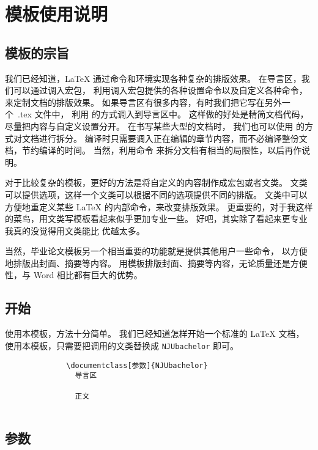 \chapter{模板使用说明}

\section{模板的宗旨}

我们已经知道，\LaTeX{} 通过命令和环境实现各种复杂的排版效果。
在导言区，我们可以通过调入宏包，
利用调入宏包提供的各种设置命令以及自定义各种命令，
来定制文档的排版效果。
如果导言区有很多内容，有时我们把它写在另外一个~.tex 文件中，
利用 \verb|| 的方式调入到导言区中。
这样做的好处是精简文档代码，尽量把内容与自定义设置分开。
在书写某些大型的文档时，
我们也可以使用 \verb|| 的方式对文档进行拆分。
编译时只需要调入正在编辑的章节内容，而不必编译整份文档，节约编译的时间。
当然，利用命令 \verb|| 来拆分文档有相当的局限性，以后再作说明。

对于比较复杂的模板，更好的方法是将自定义的内容制作成宏包或者文类。
文类可以提供选项，这样一个文类可以根据不同的选项提供不同的排版。
文类中可以方便地重定义某些 \LaTeX{} 的内部命令，来改变排版效果。
更重要的，对于我这样的菜鸟，用文类写模板看起来似乎更加专业一些。
好吧，其实除了看起来更专业我真的没觉得用文类能比 \verb|| 优越太多。

当然，毕业论文模板另一个相当重要的功能就是提供其他用户一些命令，
以方便地排版出封面、摘要等内容。
用模板排版封面、摘要等内容，无论质量还是方便性，与 Word 相比都有巨大的优势。

\section{开始}

使用本模板，方法十分简单。
我们已经知道怎样开始一个标准的 \LaTeX{} 文档，
使用本模板，只需要把调用的文类替换成 \verb|NJUbachelor| 即可。

{\small\vspace{-0.2em}%
\begin{verbatim}
              \documentclass[参数]{NJUbachelor}
                导言区
              
                正文
              
\end{verbatim}}


\section{参数}


